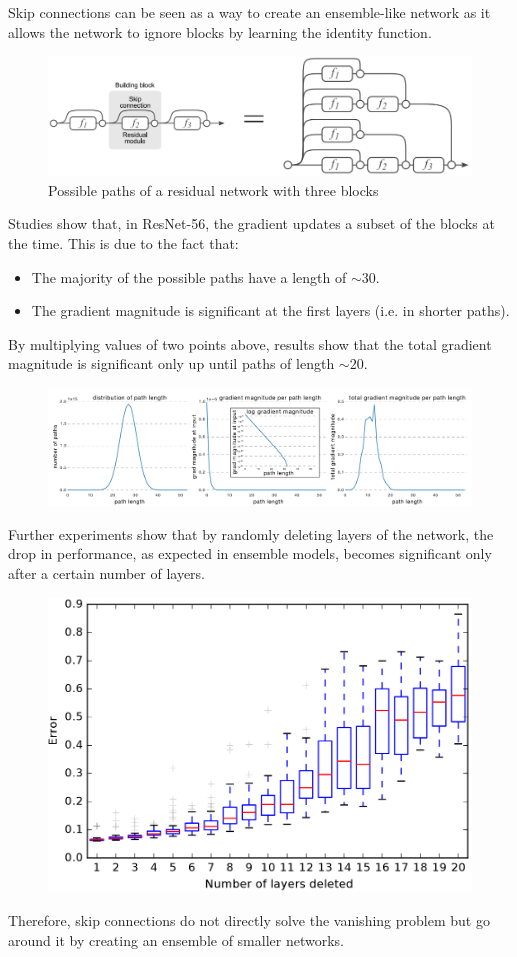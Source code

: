\begin{remark}
    Skip connections can be seen as a way to create an ensemble-like network as it allows the network to ignore blocks by learning the identity function.
    \begin{figure}[H]
        \centering
        \includegraphics[width=0.6\linewidth]{./img/resnet_ensemble.png}
        \caption{Possible paths of a residual network with three blocks}
    \end{figure}

    Studies show that, in ResNet-56, the gradient updates a subset of the blocks at the time. This is due to the fact that:
    \begin{itemize}
        \item The majority of the possible paths have a length of $\sim 30$.
        \item The gradient magnitude is significant at the first layers (i.e. in shorter paths).
    \end{itemize}
    By multiplying values of two points above, results show that the total gradient magnitude is significant only up until paths of length $\sim 20$.
    
    \begin{figure}[H]
        \centering
        \includegraphics[width=0.95\linewidth]{./img/resnet_ensemble_magnitude.png}
    \end{figure}

    Further experiments show that by randomly deleting layers of the network, the drop in performance, as expected in ensemble models, becomes significant only after a certain number of layers.
    \begin{figure}[H]
        \centering
        \includegraphics[width=0.4\linewidth]{./img/resnet_ensemble_experiment.png}
    \end{figure}

    Therefore, skip connections do not directly solve the vanishing problem but go around it by creating an ensemble of smaller networks. 
\end{remark}


